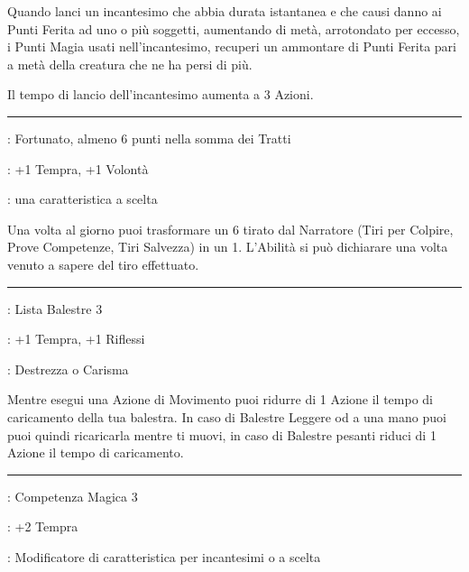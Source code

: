 \begin{multicols}{2}
Quando lanci un incantesimo che abbia durata istantanea e che causi danno ai Punti Ferita ad uno o più soggetti, aumentando di metà, arrotondato per eccesso, i Punti Magia usati nell'incantesimo, recuperi un ammontare di Punti Ferita pari a metà della creatura che ne ha persi di più.

Il tempo di lancio dell'incantesimo aumenta a 3 Azioni.

\smallskip\noindent\rule{\linewidth}{2pt} \hypertarget{Sfortunato}{}\medskip{}
\noindent
\begin{description}[noitemsep, topsep=0pt, parsep=0pt, partopsep=0pt, leftmargin=0cm, labelwidth=2.5cm]
    \item[\textbf{Requisito}]: Fortunato, almeno 6 punti nella somma dei Tratti
    \item[\textbf{Tiri Salvezza}]: +1 Tempra, +1 Volontà
    \item[\textbf{Caratteristica}]: una caratteristica a scelta
\end{description}

Una volta al giorno puoi trasformare un 6 tirato dal Narratore (Tiri per Colpire, Prove Competenze, Tiri Salvezza) in un 1. L'Abilità si può dichiarare una volta venuto a sapere del tiro effettuato.

\smallskip\noindent\rule{\linewidth}{2pt} \hypertarget{Spara e Scappa}{}\medskip{}
\noindent
\begin{description}[noitemsep, topsep=0pt, parsep=0pt, partopsep=0pt, leftmargin=0cm, labelwidth=2.5cm]
    \item[\textbf{Requisito}]: Lista Balestre 3
    \item[\textbf{Tiri Salvezza}]: +1 Tempra, +1 Riflessi
    \item[\textbf{Caratteristica}]: Destrezza o Carisma
\end{description}

Mentre esegui una Azione di Movimento puoi ridurre di 1 Azione il tempo di caricamento della tua balestra. In caso di Balestre Leggere od a una mano puoi puoi quindi ricaricarla mentre ti muovi, in caso di Balestre pesanti riduci di 1 Azione il tempo di caricamento.

\smallskip\noindent\rule{\linewidth}{2pt} \hypertarget{Specialista}{}\medskip{}
\noindent
\begin{description}[noitemsep, topsep=0pt, parsep=0pt, partopsep=0pt, leftmargin=0cm, labelwidth=2.5cm]
    \item[\textbf{Requisito}]: Competenza Magica 3
    \item[\textbf{Tiri Salvezza}]: +2 Tempra
    \item[\textbf{Caratteristica}]: Modificatore di caratteristica per incantesimi o a scelta
\end{description}


\end{multicols}
